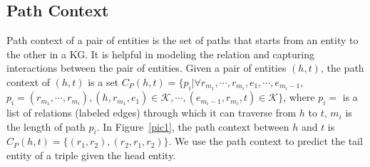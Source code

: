 \subsection{Path Context}
Path context of a pair of entities is the set of paths that starts from an entity to the other in a KG. It is helpful in modeling the relation and capturing interactions between the pair of entities. Given a pair of entities $(h,t)$, the path context of $(h,t)$ is a set $C_P(h,t)=\{p_i | \forall r_{m_1}, \cdots, r_{m_i}, e_1, \cdots, e_{m_i-1},$ $p_i=(r_{m_1}, \cdots, r_{m_i}), (h,r_{m_1},e_1)\in\mathcal{K}, \cdots, (e_{m_i-1}, r_{m_i}, t)\in\mathcal{K}\}$, where $p_i=$ is a list of relations (labeled edges) through which it can traverse from $h$ to $t$, $m_i$ is the length of path $p_i$. In Figure~\ref{pic1}, the path context between $h$ and $t$ is $C_P(h,t) = \{(r_1, r_2), (r_2, r_1, r_2)\}$. We use the path context to predict the tail entity of a triple given the head entity.
